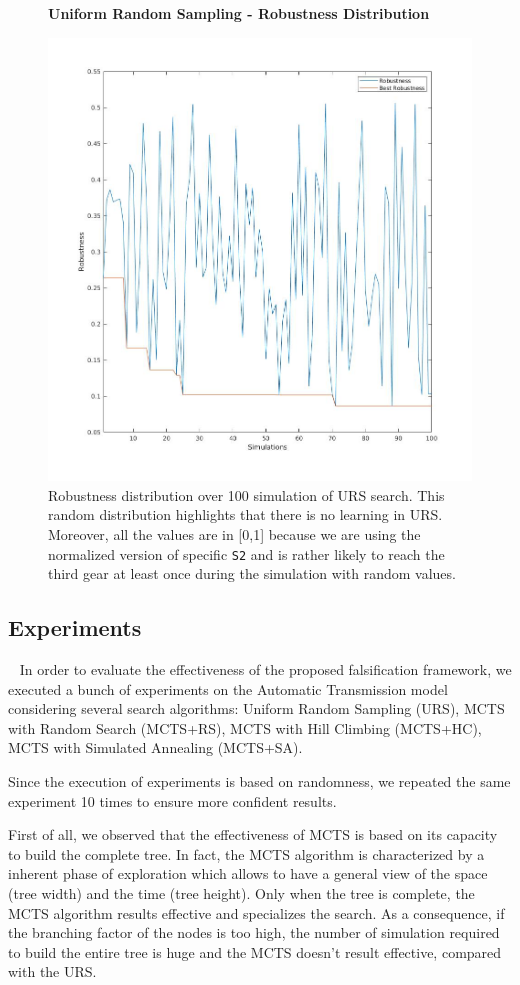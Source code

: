 \documentclass[11pt]{article}
\begin{document}
\begin{figure}[h]
    \centering
    \textbf{Uniform Random Sampling - Robustness Distribution}\par
    \includegraphics[width=0.5\linewidth]{img/urs_rob_distr.jpg}
    \caption{Robustness distribution over 100 simulation of URS search. This random distribution highlights that there is no learning in URS. Moreover, all the values are in [0,1] because we are using the normalized version of specific \texttt{S2} and is rather likely to reach the third gear at least once during the simulation with random values.}
\end{figure}

\pagebreak

\subsection{Experiments}~\label{sec:exp}
In order to evaluate the effectiveness of the proposed falsification framework, we executed a bunch of experiments on the Automatic Transmission model considering several search algorithms: Uniform Random Sampling (URS), MCTS with Random Search (MCTS+RS), MCTS with Hill Climbing (MCTS+HC), MCTS with Simulated Annealing (MCTS+SA).

Since the execution of experiments is based on randomness, we repeated the same experiment 10 times to ensure more confident results.

First of all, we observed that the effectiveness of MCTS is based on its capacity to build the complete tree. In fact, the MCTS algorithm is characterized by a inherent phase of exploration which allows to have a general view of the space (tree width) and the time (tree height). Only when the tree is complete, the MCTS algorithm results effective and specializes the search.
As a consequence, if the branching factor of the nodes is too high, the number of simulation required to build the entire tree is huge and the MCTS doesn't result effective, compared with the URS. 
\end{document}
